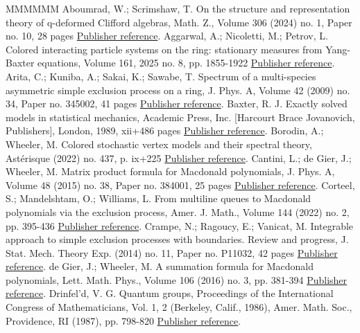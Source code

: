 \begin{thebibliography}{MMMMMM}
 Aboumrad, W.; Scrimshaw, T. On the structure and representation theory of q-deformed Clifford algebras, Math. Z., Volume 306 (2024) no. 1, Paper no. 10, 28 pages \href{https://alco.centre-mersenne.org/articles/10.5802/alco.457/#AS24}{Publisher reference}.
 Aggarwal, A.; Nicoletti, M.; Petrov, L. Colored interacting particle systems on the ring: stationary measures from Yang-Baxter equations, Volume 161, 2025 no. 8, pp. 1855-1922 \href{https://alco.centre-mersenne.org/articles/10.5802/alco.457/#ANP}{Publisher reference}.
 Arita, C.; Kuniba, A.; Sakai, K.; Sawabe, T. Spectrum of a multi-species asymmetric simple exclusion process on a ring, J. Phys. A, Volume 42 (2009) no. 34, Paper no. 345002, 41 pages \href{https://alco.centre-mersenne.org/articles/10.5802/alco.457/#AKSS}{Publisher reference}.
 Baxter, R. J. Exactly solved models in statistical mechanics, Academic Press, Inc. [Harcourt Brace Jovanovich, Publishers], London, 1989, xii+486 pages \href{https://alco.centre-mersenne.org/articles/10.5802/alco.457/#Bax}{Publisher reference}.
 Borodin, A.; Wheeler, M. Colored stochastic vertex models and their spectral theory, Astérisque (2022) no. 437, p. ix+225 \href{https://alco.centre-mersenne.org/articles/10.5802/alco.457/#BW}{Publisher reference}.
 Cantini, L.; de Gier, J.; Wheeler, M. Matrix product formula for Macdonald polynomials, J. Phys. A, Volume 48 (2015) no. 38, Paper no. 384001, 25 pages \href{https://alco.centre-mersenne.org/articles/10.5802/alco.457/#CDW}{Publisher reference}.
 Corteel, S.; Mandelshtam, O.; Williams, L. From multiline queues to Macdonald polynomials via the exclusion process, Amer. J. Math., Volume 144 (2022) no. 2, pp. 395-436 \href{https://alco.centre-mersenne.org/articles/10.5802/alco.457/#CMW}{Publisher reference}.
 Crampe, N.; Ragoucy, E.; Vanicat, M. Integrable approach to simple exclusion processes with boundaries. Review and progress, J. Stat. Mech. Theory Exp. (2014) no. 11, Paper no. P11032, 42 pages \href{https://alco.centre-mersenne.org/articles/10.5802/alco.457/#CRV}{Publisher reference}.
 de Gier, J.; Wheeler, M. A summation formula for Macdonald polynomials, Lett. Math. Phys., Volume 106 (2016) no. 3, pp. 381-394 \href{https://alco.centre-mersenne.org/articles/10.5802/alco.457/#DW}{Publisher reference}.
 Drinfel’d, V. G. Quantum groups, Proceedings of the International Congress of Mathematicians, Vol. 1, 2 (Berkeley, Calif., 1986), Amer. Math. Soc., Providence, RI (1987), pp. 798-820 \href{https://alco.centre-mersenne.org/articles/10.5802/alco.457/#D86}{Publisher reference}.

\end{thebibliography}
